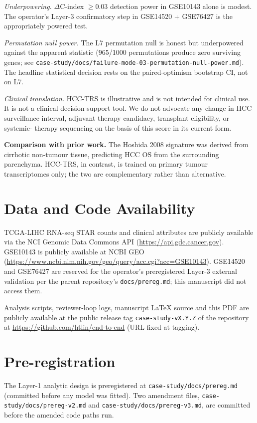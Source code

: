 \documentclass[12pt]{article}
\newcommand{\HCCRTS}{HCC-TRS\xspace}
\begin{document}
\emph{Underpowering.} $\Delta$C-index $\geq 0.03$ detection power in
GSE10143 alone is modest. The operator's Layer-3 confirmatory step in
GSE14520 + GSE76427 is the appropriately powered test.

\emph{Permutation null power.} The L7 permutation null is honest but
underpowered against the apparent statistic (965/1000 permutations
produce zero surviving genes; see
\texttt{case-study/docs/failure-mode-03-permutation-null-power.md}).
The headline statistical decision rests on the paired-optimism
bootstrap CI, not on L7.

\emph{Clinical translation.} \HCCRTS is illustrative and is not
intended for clinical use. It is not a clinical decision-support
tool. We do not advocate any change in HCC surveillance interval,
adjuvant therapy candidacy, transplant eligibility, or systemic-
therapy sequencing on the basis of this score in its current form.

\textbf{Comparison with prior work.} The Hoshida 2008
signature\citep{hoshida2008gene} was derived from cirrhotic non-tumour
tissue, predicting HCC OS from the surrounding parenchyma. \HCCRTS,
in contrast, is trained on primary tumour transcriptomes only; the
two are complementary rather than alternative.

\section*{Data and Code Availability}

TCGA-LIHC RNA-seq STAR counts and clinical attributes are publicly
available via the NCI Genomic Data Commons API
(\url{https://api.gdc.cancer.gov}). GSE10143 is publicly available
at NCBI GEO (\url{https://www.ncbi.nlm.nih.gov/geo/query/acc.cgi?acc=GSE10143}).
GSE14520 and GSE76427 are reserved for the operator's preregistered
Layer-3 external validation per the parent repository's
\texttt{docs/prereg.md}; this manuscript did not access them.

Analysis scripts, reviewer-loop logs, manuscript LaTeX source and
this PDF are publicly available at the public release tag
\texttt{case-study-vX.Y.Z} of the repository at
\url{https://github.com/htlin/end-to-end} (URL fixed at tagging).

\section*{Pre-registration}

The Layer-1 analytic design is preregistered at
\texttt{case-study/docs/prereg.md} (committed before any model was
fitted). Two amendment files,
\texttt{case-study/docs/prereg-v2.md} and
\texttt{case-study/docs/prereg-v3.md}, are committed before the
amended code paths run.
\end{document}
